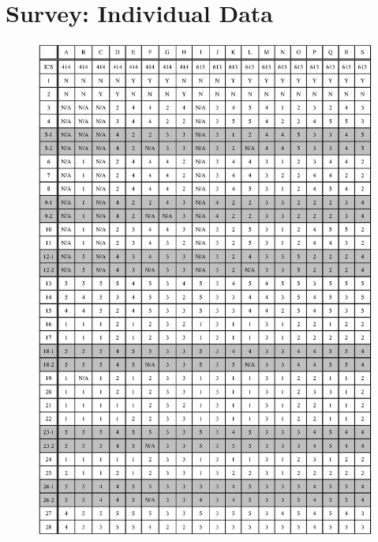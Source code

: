 
\appendix

\chapter{Survey: Individual Data}
\label{appndx:survey-individual}

\begin{figure}[htbp]
  \centering
  \includegraphics{images/appndx-1.eps}
  \label{appndx-1}
\end{figure}

